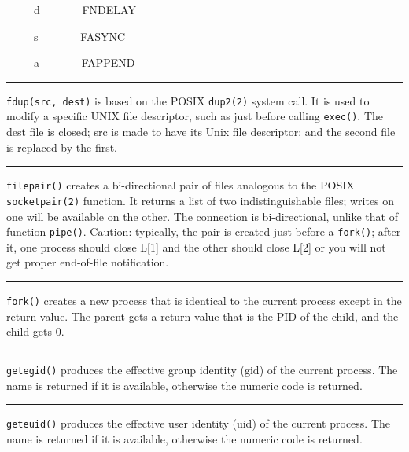 \ \ \ \ \ d \ \ \ \ \ \ \ FNDELAY 

\ \ \ \ \ s \ \ \ \ \ \ \ FASYNC 

\ \ \ \ \ a \ \ \ \ \ \ \ FAPPEND 

\bigskip\hrule\vspace{0.1cm}

\noindent
\texttt{fdup(src, dest)} is based on the POSIX \texttt{dup2(2)} system
call. It is used to
modify a specific UNIX file descriptor, such as just before calling
\texttt{exec()}. The dest file is closed; src is made to have its Unix file
descriptor; and the second file is replaced by the first. 

\bigskip\hrule\vspace{0.1cm}

\noindent
\texttt{filepair()} creates a bi-directional pair of files
analogous to the POSIX \texttt{socketpair(2)} function. It returns a list of two
indistinguishable files; writes on one will be available on the other. The
connection is bi-directional, unlike that of function \texttt{pipe()}.
Caution: typically, the pair is
created just before a \texttt{fork()}; after it, one process should close L[1]
and the other should close L[2] or you will not get proper end-of-file
notification. 

\bigskip\hrule\vspace{0.1cm}

\noindent
\texttt{fork()} creates a new process that is identical to the current process
except in the return value. The parent gets a return value that is the
PID of the child, and the child gets 0.

\bigskip\hrule\vspace{0.1cm}

\noindent
\texttt{getegid()} produces the effective group identity (gid) of the current
process. The name is returned if it is available, otherwise the numeric
code is returned.

\bigskip\hrule\vspace{0.1cm}

\noindent
\texttt{geteuid()} produces the effective user identity (uid) of the current
process. The name is returned if it is available, otherwise the numeric
code is returned.

